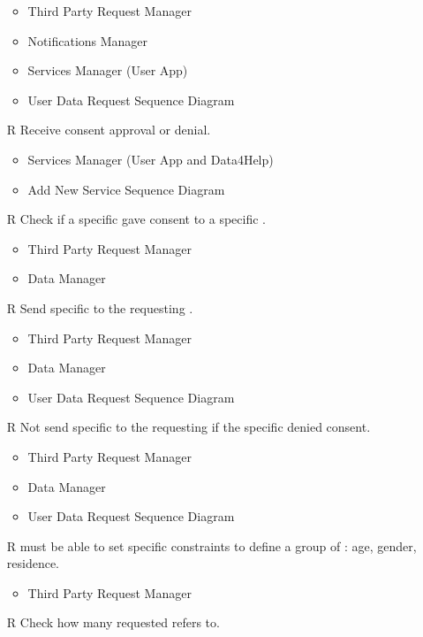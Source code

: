 \begin{itemize}
	\begin{itemize}
		\item Third Party Request Manager
		\item Notifications Manager
		\item Services Manager (User App)
		\item User Data Request Sequence Diagram
	\end{itemize}
	\item[R\subs{17}]Receive  consent approval or denial.
	\begin{itemize}
		\item Services Manager (User App and Data4Help)
		\item Add New Service Sequence Diagram
	\end{itemize}
	\item[R\subs{18}]Check if a specific  gave consent to a specific .
	\begin{itemize}
		\item Third Party Request Manager
		\item Data Manager
	\end{itemize}
	\item[R\subs{19}]Send specific to the requesting .
	\begin{itemize}
		\item Third Party Request Manager
		\item Data Manager
		\item User Data Request Sequence Diagram
	\end{itemize}
	\item[R\subs{20}]Not send specific to the requesting  if the specific  denied consent.
	\begin{itemize}
		\item Third Party Request Manager
		\item Data Manager
		\item User Data Request Sequence Diagram
	\end{itemize}
	\item[R\subs{21}] must be able to set specific constraints to define a group of : age, gender, residence.
	\begin{itemize}
		\item Third Party Request Manager
	\end{itemize}
	\item[R\subs{22}]Check how many  requested  refers to.

\end{itemize}
